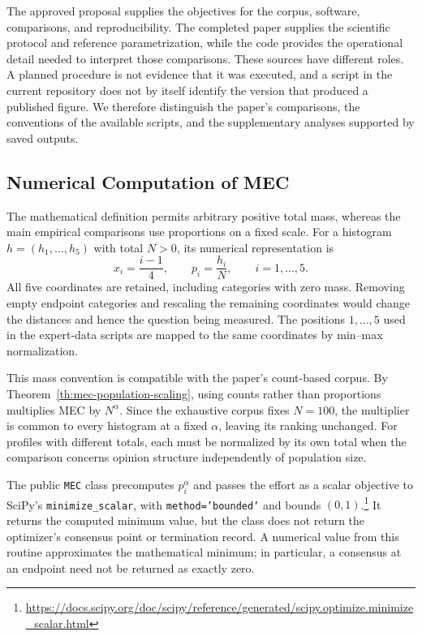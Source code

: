 \documentclass{article}
\theoremstyle{plain}
\theoremstyle{remark}
\begin{document}
The approved proposal supplies the objectives for the corpus, software, comparisons, and reproducibility. The completed paper supplies the scientific protocol and reference parametrization, while the code provides the operational detail needed to interpret those comparisons. These sources have different roles. A planned procedure is not evidence that it was executed, and a script in the current repository does not by itself identify the version that produced a published figure. We therefore distinguish the paper's comparisons, the conventions of the available scripts, and the supplementary analyses supported by saved outputs.

\subsection{Numerical Computation of MEC}\label{subsec:methods-computation}

The mathematical definition permits arbitrary positive total mass, whereas the main empirical comparisons use proportions on a fixed scale. For a histogram $h=(h_1,\ldots,h_5)$ with total $N>0$, its numerical representation is
\begin{equation}\label{eq:methods-histogram-representation}
x_i=\frac{i-1}{4},\qquad p_i=\frac{h_i}{N},\qquad i=1,\ldots,5.
\end{equation}
All five coordinates are retained, including categories with zero mass. Removing empty endpoint categories and rescaling the remaining coordinates would change the distances and hence the question being measured. The positions $1,\ldots,5$ used in the expert-data scripts are mapped to the same coordinates by min--max normalization.

This mass convention is compatible with the paper's count-based corpus. By Theorem~\ref{th:mec-population-scaling}, using counts rather than proportions multiplies MEC by $N^\alpha$. Since the exhaustive corpus fixes $N=100$, the multiplier is common to every histogram at a fixed $\alpha$, leaving its ranking unchanged. For profiles with different totals, each must be normalized by its own total when the comparison concerns opinion structure independently of population size.

The public \texttt{MEC} class precomputes $p_i^\alpha$ and passes the effort as a scalar objective to SciPy's \texttt{minimize\_\allowbreak scalar}, with \texttt{method='bounded'} and bounds $(0,1)$.\footnote{\url{https://docs.scipy.org/doc/scipy/reference/generated/scipy.optimize.minimize_scalar.html}} It returns the computed minimum value, but the class does not return the optimizer's consensus point or termination record. A numerical value from this routine approximates the mathematical minimum; in particular, a consensus at an endpoint need not be returned as exactly zero.
\end{document}
